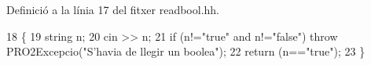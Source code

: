 Definició a la línia 17 del fitxer readbool.\+hh.


\begin{DoxyCode}
18 \{
19   \textcolor{keywordtype}{string} n;
20   cin >> n;
21   \textcolor{keywordflow}{if} (n!=\textcolor{stringliteral}{"true"} and n!=\textcolor{stringliteral}{"false"}) \textcolor{keywordflow}{throw} PRO2Excepcio(\textcolor{stringliteral}{"S'havia de llegir un boolea"});
22   \textcolor{keywordflow}{return} (n==\textcolor{stringliteral}{"true"});
23 \}
\end{DoxyCode}
